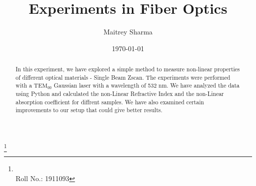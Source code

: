\documentclass[%
 reprint,
 amsmath,amssymb,
 aps,
]{revtex4-2}
\begin{document}

\title{Experiments in Fiber Optics}%

\author{Maitrey Sharma}
\thanks{\\Roll No.: 1911093}
%



\date{\today}%

\begin{abstract}
In this experiment, we have explored a simple method to measure non-linear properties of different
optical materials - Single Beam Zscan. The experiments were performed with a $ \mathrm{TEM}_{00} $ Gaussian laser
with a wavelength of 532 nm. We have analyzed the data using Python and calculated the non-Linear
Refractive Index  and the non-Linear absorption  coefficient for diffrent samples. We have
also examined certain improvements to our setup that could give better results.
\end{abstract}
\end{document}
